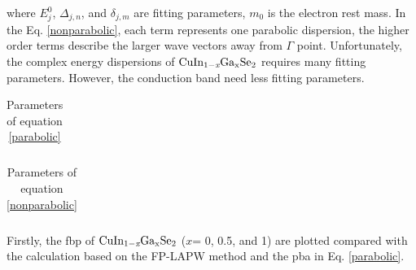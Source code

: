 \documentclass[a4paper, 12pt, titlepage,oneside,drop]{kthesis}
\begin{document}
where  $E_j^0$, $\Delta_{j,n}$, and $\delta_{j,m}$ are fitting parameters, ${m_0}$ is the electron rest mass. In the Eq. \ref{nonparabolic}, each term represents one
parabolic dispersion, the higher order terms describe the larger wave vectors away from $\Gamma$ point. Unfortunately, the complex
energy dispersions of $\mathrm { CuIn_{1-\textit{x}}Ga_{x}Se_2}$ requires many fitting parameters. However, the conduction band need less fitting parameters.

 \newpage

\begin{table}[ht]
\caption{Parameters of equation \ref{parabolic}}
\begin{center}
\begin{tabular}{ccc}
\end{tabular}
\end{center}
\label{rd1}
\end{table}

\begin{table}[ht]
\caption{Parameters of equation \ref{nonparabolic}}
\begin{center}
\begin{tabular}{ccc}
\end{tabular}
\end{center}
\label{rd2}
\end{table}


 \newpage

Firstly, the fbp of $\mathrm { CuIn_{1-\textit{x}}Ga_{x}Se_2}$ ($x$= 0, 0.5, and 1) are plotted compared with the calculation based on the FP-LAPW method and the pba in 
Eq. \ref{parabolic}.
\end{document}
